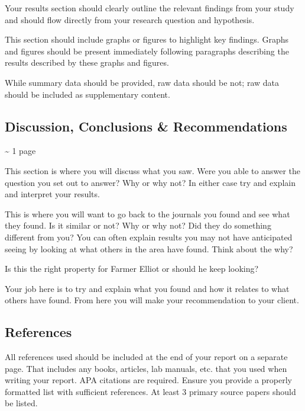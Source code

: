\documentclass[
]{book}
\begin{document}
Your results section should clearly outline the relevant findings from your study and should flow directly from your research question and hypothesis.

This section should include graphs or figures to highlight key findings. Graphs and figures should be present immediately following paragraphs describing the results described by these graphs and figures.

While summary data should be provided, raw data should be not; raw data should be included as supplementary content.

\hypertarget{discussion-conclusions-recommendations}{%
\subsection*{Discussion, Conclusions \& Recommendations}\label{discussion-conclusions-recommendations}}

\textasciitilde{} 1 page

This section is where you will discuss what you saw. Were you able to answer the question you set out to answer? Why or why not? In either case try and explain and interpret your results.

This is where you will want to go back to the journals you found and see what they found. Is it similar or not? Why or why not? Did they do something different from you? You can often explain results you may not have anticipated seeing by looking at what others in the area have found. Think about the why?

Is this the right property for Farmer Elliot or should he keep looking?

Your job here is to try and explain what you found and how it relates to what others have found. From here you will make your recommendation to your client.

\hypertarget{references}{%
\subsection*{References}\label{references}}

All references used should be included at the end of your report on a separate page. That includes any books, articles, lab manuals, etc. that you used when writing your report. APA citations are required. Ensure you provide a properly formatted list with sufficient references. At least 3 primary source papers should be listed.
\end{document}
